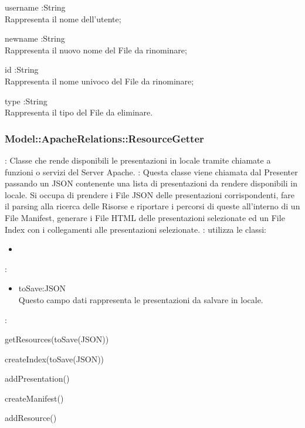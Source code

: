 {\begin{itemize}
				\end{itemize}
			}
			

\subsubsection{Model::ApacheRelations::ResourceGetter}{
	\textbf{\descrizione}: Classe che rende disponibili le presentazioni in locale tramite chiamate a funzioni o servizi del Server Apache.
	\textbf{\utilizzo}: Questa classe viene chiamata dal Presenter passando un JSON contenente una lista di presentazioni da rendere disponibili in locale. Si occupa di prendere i File JSON delle presentazioni corrispondenti, fare il parsing alla ricerca delle Risorse e riportare i percorsi di queste all'interno di un File Manifest, generare i File HTML delle presentazioni selezionate ed un File Index con i collegamenti alle presentazioni selezionate.
	\textbf{\relazioni}: utilizza le classi:
	\begin{itemize}
	\item
	\end{itemize}
	\textbf{\attributi}:
	\begin{itemize}
		\item toSave:JSON \\Questo campo dati rappresenta le presentazioni da salvare in locale.
	\end{itemize}
	\textbf{\metodi}:
	\begin{\itemize}
	\item getResources(toSave(JSON))
	\item createIndex(toSave(JSON))
	\item addPresentation()
	\item createManifest()
	\item addResource()
	\end{\itemize}
}